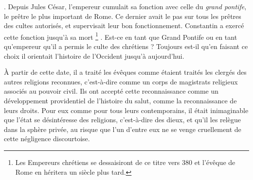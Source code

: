 . Depuis Jules César, l'empereur cumulait sa fonction avec celle du \emph{grand pontife}, le prêtre le plus important de Rome. Ce dernier avait le pas sur tous les prêtres des cultes autorisés, et supervisait leur bon fonctionnement. Constantin a exercé cette fonction jusqu'à sa mort%
\footnote{Les Empereurs chrétiens se dessaisiront de ce titre vers 380 et l'évêque de Rome en héritera un siècle plus tard.}%
. Est-ce en tant que Grand Pontife ou en tant qu'empereur qu'il a permis le culte des chrétiens ? Toujours est-il qu'en faisant ce choix il orientait l'histoire de l'Occident jusqu'à aujourd'hui.

 À partir de cette date, il a traité les évêques comme étaient traités les clergés des autres religions reconnues, c'est-à-dire comme un corps de magistrats religieux associés au pouvoir civil. Ils ont accepté cette reconnaissance comme un développement providentiel de l'histoire du salut, comme la reconnaissance de leurs droits. Pour eux comme pour tous leurs contemporains, il était inimaginable que l'état se désintéresse des religions, c'est-à-dire des dieux, et qu'il les relègue dans la sphère privée, au risque que l'un d'entre eux ne se venge cruellement de cette négligence discourtoise. 

